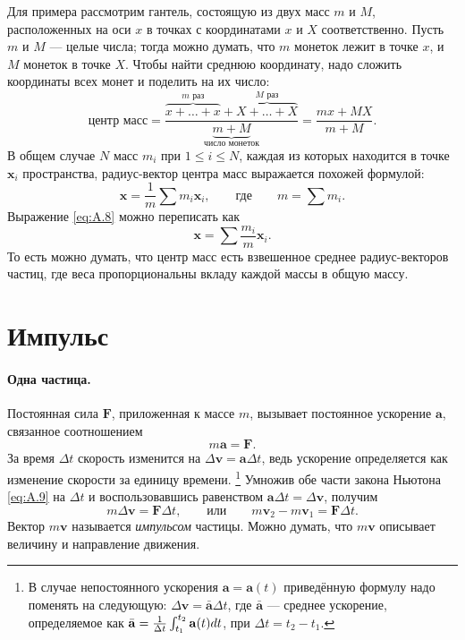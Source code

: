 Для примера рассмотрим гантель, состоящую из двух масс $m$ и $M$, расположенных на оси $x$ в точках с координатами $x$ и $X$ соответственно.
Пусть $m$ и $M$ --- целые числа;
тогда можно думать, что $m$ монеток лежит в точке $x$,
и $M$ монеток в точке $X$.
Чтобы найти среднюю координату, надо сложить координаты всех монет и поделить на их число:
\[
\text{центр масс} =
\frac{\overbrace{x+\dots+x}^{\text{$m$ раз}}+\overbrace{X+\dots+X}^{\text{$M$ раз}}}{\underbrace{m+M}_{\text{число монеток}}}
=\frac{mx+MX}{m+M}.
\]
В общем случае $N$ масс $m_i$ при $1 \le i \le N$, каждая из
которых находится в точке $\mathbf{x}_i$ пространства, радиус-вектор
центра масс выражается похожей формулой:
\begin{equation}
\mathbf{x}=\frac{1}{m} \sum m_i  \mathbf{x}_i,
\qquad\text{где}\qquad m=\sum m_i.
\label{eq:A.8}
\end{equation}
Выражение \eqref{eq:A.8} можно переписать как
\[
\mathbf{x}=\sum \frac{m_i}{m}  \mathbf{x}_i.
\]
То есть можно думать, что центр масс есть взвешенное среднее радиус-векторов частиц, где веса пропорциональны вкладу каждой массы в общую массу.

\section{Импульс}\label{Импульс}\label{sec:A.4}

\paragraph{Одна частица.}
Постоянная сила $\mathbf{F}$, приложенная
к массе $m$, вызывает постоянное ускорение $\mathbf{a}$, связанное соотношением
\begin{equation}
m \mathbf{a}=\mathbf{F}.
\label{eq:A.9}
\end{equation}
За время $\Delta t$ скорость изменится на
$\Delta \mathbf{v}=\mathbf{a}\Delta t$, ведь ускорение определяется как изменение скорости за единицу времени.%
\footnote{В случае непостоянного ускорения $\mathbf{a}= \mathbf{a}(t)$ приведённую формулу надо поменять на следующую: $\Delta \mathbf{v}=\bar{\mathbf{a}}  \Delta t$,
где $\bar{\mathbf{a}}$ --- среднее ускорение, определяемое как
$\bar{\mathbf{a}} \z= \frac{1}{\Delta t} \int_{t_1}^{t_2} \mathbf{a}(t) dt$,
при $\Delta t=t_2-t_1$.
}
Умножив обе части закона Ньютона \eqref{eq:A.9} на $\Delta t$
и воспользовавшись равенством $\mathbf{a}\Delta t=\Delta \mathbf{v}$, получим
\begin{equation}
m \Delta \mathbf{v}=\mathbf{F}\Delta t,
\qquad \text{или} \qquad
m \mathbf{v}_2-m \mathbf{v}_1=\mathbf{F}\Delta t.
\label{eq:A.10}
\end{equation}
Вектор $m\mathbf{v}$ называется \textit{импульсом} частицы.
Можно думать, что $m\mathbf{v}$ описывает величину и направление движения.


